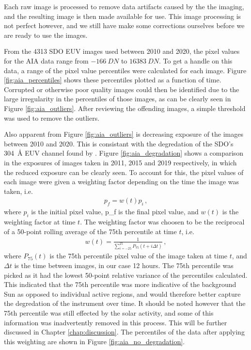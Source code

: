 \documentclass[11pt,a4paper,onecolumn]{report}
\begin{document}
Each raw image is processed to remove data artifacts caused by the the imaging,
and the resulting image is then made available for use. This image processing is
not perfect however, and we still have make some corrections ourselves before we
are ready to use the images.

From the 4313 SDO EUV images used between 2010 and 2020, the pixel values for the
AIA data range from \(\SI[]{-166}[]{DN}\) to \(\SI[]{16383}[]{DN}\). To get a
handle on this data, a range of the pixel value percentiles were calculated for
each image. Figure \ref{fig:aia_percentiles} shows these percentiles plotted as
a function of time. Corrupted or otherwise poor quality images could then be
identified due to the large irregularity in the percentiles of those images, as
can be clearly seen in Figure \ref{fig:aia_outliers}. After reviewing the
offending images, a simple threshold was used to remove the outliers.

Also apparent from Figure \ref{fig:aia_outliers} is decreasing exposure of the
images between 2010 and 2020. This is consistant with the degredation of the
SDO's \SI{304}{\angstrom} EUV channel found by \citet{boerner_photometric_2014}.
Figure \ref{fig:aia_degradation} shows a comparison in the exposures of
images taken in 2011, 2015 and 2019 respectively, in which the reduced exposure
can be clearly seen. To account for this, the pixel
values of each image were given a weighting factor depending on the time the
image was taken, i.e.
\begin{align}
  p_f = w(t) p_i \, ,
\end{align}
where $p_i$ is the initial pixel value, p_f is the final pixel value, and $w(t)$
is the weighting factor at time $t$. The weighting factor was choosen to be the 
reciprocal of a 50-point rolling average of the 75th
percentile at time $t$, i.e.
\begin{align}
  w(t) = \frac{1}{\sum\limits_{i=-25}^{25}P_{75}(t + i \Delta t)} \, ,
\end{align}
where $P_{75}(t)$ is the 75th percentile pixel value of the image taken at time
$t$, and $\Delta t$ is the time between images, in our case 12 hours. The 75th
percentile was picked as it had the lowest 50-point relative variance of the
percentiles calculated. This indicated that the 75th percentile was more
indicative of the background Sun as opposed to individual active regions, and
would therefore better capture the degredation of the instrument over time. It
should be noted however that the 75th percentile was still effected by the solar
activity, and some of this information was inadvertently removed in this
process. This will be further discussed in Chapter \ref{chap:discussion}. The
percentiles of the data after applying this weighting are shown in Figure
\ref{fig:aia_no_degradation}. \\
\end{document}
